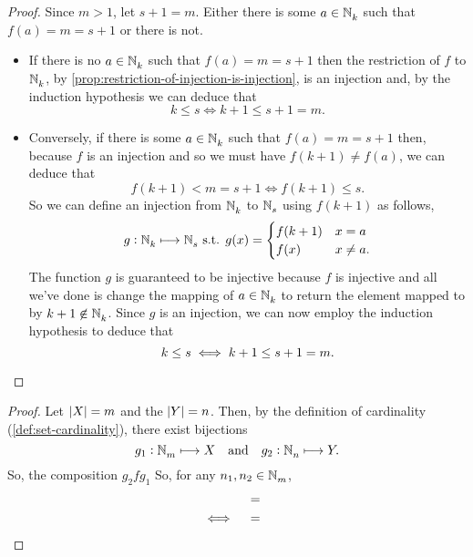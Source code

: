 \documentclass[../MathsNotesBase.tex]{subfiles}
\begin{document}
{\begin{proof}
			Since ${ m > 1 }$, let ${ s + 1 = m }$. Either there is some ${ a \in \mathbb{N}^{}_k }$ such that ${ f(a) = m = s+1 }$ or there is not.
			\begin{itemize}
				\item If there is no ${ a \in \mathbb{N}^{}_k }$ such that ${ f(a) = m = s+1 }$ then the restriction of $f$ to $\mathbb{N}^{}_k$, by \autoref{prop:restriction-of-injection-is-injection}, is an injection and, by the induction hypothesis we can deduce that
				\[ k \leq s \iff k + 1 \leq s + 1 = m. \]
				
				\bigskip
				\item Conversely, if there is some ${ a \in \mathbb{N}^{}_k }$ such that ${ f(a) = m = s+1 }$ then, because $f$ is an injection and so we must have ${ f(k+1) \neq f(a) }$, we can deduce that
				\[ f(k+1) < m = s+1 \iff f(k+1) \leq s. \]
				So we can define an injection from $\mathbb{N}^{}_k$ to $\mathbb{N}^{}_s$ using $f(k+1)$ as follows,
				\[	g: \mathbb{N}^{}_k \longmapsto \mathbb{N}^{}_s \text{ s.t. } g(x) = 	\begin{cases}
					f(k+1) & x = a \\
					f(x) & x \neq a.	
				\end{cases}
				\]
				The function $g$ is guaranteed to be injective because $f$ is injective and all we've done is change the mapping of ${ a \in \mathbb{N}^{}_k }$ to return the element mapped to by ${ k+1 \centernot\in \N{}_k }$. Since $g$ is an injection, we can now employ the induction hypothesis to deduce that
				\[ k \leq s \iff k + 1 \leq s + 1 = m. \qedhere \]
			\end{itemize}
		\end{proof}
		
		
		\bigskip
		\begin{proof}
			Let ${ \left\lvert X\right\rvert = m }$ and the ${ \left\lvert Y\right\rvert = n }$. Then, by the definition of cardinality (\ref{def:set-cardinality}), there exist bijections
			\[ g_1: \mathbb{N}^{}_m \longmapsto X \hspace{10pt}\text{and}\hspace{10pt} g_2: \mathbb{N}^{}_n \longmapsto Y. \]
			So, the composition ${ g_2 f g_1 }$
			So, for any ${ n_1, n_2 \in \mathbb{N}^{}_m }$,
			\[\begin{aligned}
				&&  &=  \\
				&\iff &  &=  &\text{\scriptsize{}} \\
			\end{aligned}\]
		\end{proof}
		
}
\end{document}
